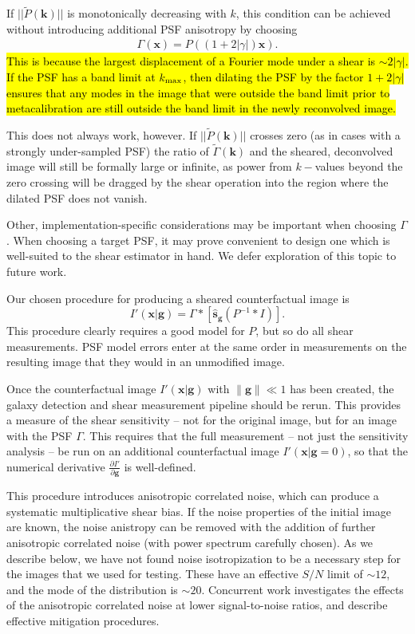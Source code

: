 \documentclass[iop]{emulateapj}
\begin{document}
If $||\tilde{P}(\mathbf{k})||$ is monotonically decreasing with $k$,
this condition can be achieved without introducing additional PSF
anisotropy by choosing
\begin{align}
\Gamma(\mathbf{x}) = P\left((1+2|\gamma|)\mathbf{x}\right).
\end{align}
\hl{This is because the largest displacement of a Fourier mode under a
shear is $\sim 2|\gamma|$. If the PSF has a band limit at
$k_{\rm max}$, then dilating the PSF by the factor $1+2|\gamma|$
ensures that any modes in the image that were outside the band limit
prior to metacalibration are still outside the band limit in the newly
reconvolved image.}

This does not always work, however. If $||\tilde{P}(\mathbf{k})||$
crosses zero (as in cases with a strongly under-sampled PSF) the
ratio of $\tilde{\Gamma}(\mathbf{k})$ and the sheared, deconvolved
image will still be formally large or infinite, as power from
$k-$values beyond the zero crossing will be dragged by the shear
operation into the region where the dilated PSF does not vanish.

Other, implementation-specific considerations may be important when
choosing $\Gamma$. When choosing a target PSF, it may prove convenient
to design one which is well-suited to the shear estimator in hand. We
defer exploration of this topic to future work.

Our chosen procedure for producing a sheared counterfactual image is
\begin{equation}
I'({\mathbf{x}}|\mathbf{g}) = \Gamma \ast \left[\hat{\mathbf{s}}_\mathbf{g} \left(P^{-1} \ast I \right)\right].
\end{equation}
This procedure clearly requires a good model for $P$, but so do all
shear measurements. PSF model errors enter at the
same order in measurements on the resulting image that they would in
an unmodified image.

Once the counterfactual image $I'(\mathbf{x}|\mathbf{g})$ with
$\|\mathbf{g}\| \ll 1$ has been created, the galaxy detection and
shear measurement pipeline should be rerun. This provides a measure of
the shear sensitivity -- not for the original image, but for an image
with the PSF $\Gamma$. This requires that the full measurement -- not
just the sensitivity analysis -- be run on an additional
counterfactual image $I'(\mathbf{x}|\mathbf{g}=0)$, so that the numerical
derivative $\frac{\partial I'}{\partial \mathbf{g}}$ is well-defined.

This procedure introduces anisotropic correlated noise, which can
produce a systematic multiplicative shear bias. If the noise
properties of the initial image are known, the noise anistropy can be
removed with the addition of further anisotropic correlated noise
(with power spectrum carefully chosen). As we describe below, we have
not found noise isotropization to be a necessary step for the images
that we used for testing.  These have an effective $S/N$ limit of
$\sim 12$, and the mode of the distribution is $\sim20$. Concurrent
work \citep{metacalII} investigates the effects of the anisotropic
correlated noise at lower signal-to-noise ratios, and describe
effective mitigation procedures.
\end{document}
